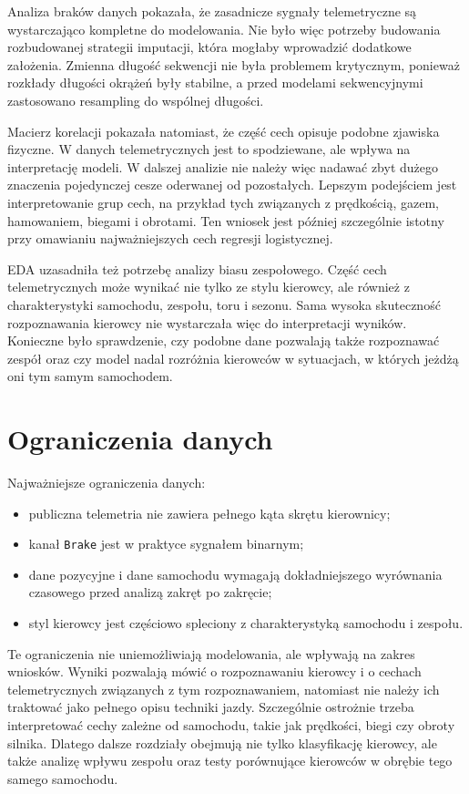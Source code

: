 \documentclass[printmode,pl]{mgr}
\begin{document}
Analiza braków danych pokazała, że zasadnicze sygnały telemetryczne są wystarczająco kompletne do modelowania. Nie było więc potrzeby budowania rozbudowanej strategii imputacji, która mogłaby wprowadzić dodatkowe założenia. Zmienna długość sekwencji nie była problemem krytycznym, ponieważ rozkłady długości okrążeń były stabilne, a przed modelami sekwencyjnymi zastosowano resampling do wspólnej długości.

Macierz korelacji pokazała natomiast, że część cech opisuje podobne zjawiska fizyczne. W danych telemetrycznych jest to spodziewane, ale wpływa na interpretację modeli. W dalszej analizie nie należy więc nadawać zbyt dużego znaczenia pojedynczej cesze oderwanej od pozostałych. Lepszym podejściem jest interpretowanie grup cech, na przykład tych związanych z prędkością, gazem, hamowaniem, biegami i obrotami. Ten wniosek jest później szczególnie istotny przy omawianiu najważniejszych cech regresji logistycznej.

EDA uzasadniła też potrzebę analizy biasu zespołowego. Część cech telemetrycznych może wynikać nie tylko ze stylu kierowcy, ale również z charakterystyki samochodu, zespołu, toru i sezonu. Sama wysoka skuteczność rozpoznawania kierowcy nie wystarczała więc do interpretacji wyników. Konieczne było sprawdzenie, czy podobne dane pozwalają także rozpoznawać zespół oraz czy model nadal rozróżnia kierowców w sytuacjach, w których jeżdżą oni tym samym samochodem.

\section{Ograniczenia danych}

Najważniejsze ograniczenia danych:

\begin{itemize}
    \item publiczna telemetria nie zawiera pełnego kąta skrętu kierownicy;
    \item kanał \texttt{Brake} jest w praktyce sygnałem binarnym;
    \item dane pozycyjne i dane samochodu wymagają dokładniejszego wyrównania czasowego przed analizą zakręt po zakręcie;
    \item styl kierowcy jest częściowo spleciony z charakterystyką samochodu i zespołu.
\end{itemize}

Te ograniczenia nie uniemożliwiają modelowania, ale wpływają na zakres wniosków. Wyniki pozwalają mówić o rozpoznawaniu kierowcy i o cechach telemetrycznych związanych z tym rozpoznawaniem, natomiast nie należy ich traktować jako pełnego opisu techniki jazdy. Szczególnie ostrożnie trzeba interpretować cechy zależne od samochodu, takie jak prędkości, biegi czy obroty silnika. Dlatego dalsze rozdziały obejmują nie tylko klasyfikację kierowcy, ale także analizę wpływu zespołu oraz testy porównujące kierowców w obrębie tego samego samochodu.
\end{document}
